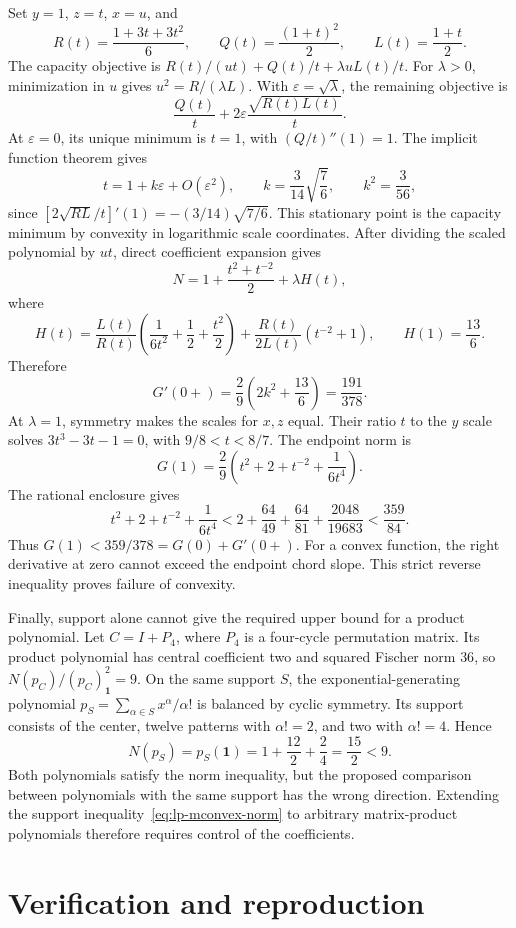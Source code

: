 \documentclass[11pt,a4paper]{article}
\theoremstyle{definition}
\theoremstyle{remark}
\begin{document}
Set $y=1$, $z=t$, $x=u$, and
\[
 R(t)=\frac{1+3t+3t^2}{6},\qquad
 Q(t)=\frac{(1+t)^2}{2},\qquad L(t)=\frac{1+t}{2}.
\]
The capacity objective is
$R(t)/(ut)+Q(t)/t+\lambda uL(t)/t$.
For $\lambda>0$, minimization in $u$ gives $u^2=R/(\lambda L)$.
With $\varepsilon=\sqrt\lambda$, the remaining objective is
\[
 \frac{Q(t)}t+2\varepsilon\frac{\sqrt{R(t)L(t)}}t.
\]
At $\varepsilon=0$, its unique minimum is $t=1$,
with $(Q/t)''(1)=1$.
The implicit function theorem gives
\[
 t=1+k\varepsilon+O(\varepsilon^2),\qquad
 k=\frac3{14}\sqrt{\frac76},\qquad k^2=\frac3{56},
\]
since $[2\sqrt{RL}/t]'(1)=-(3/14)\sqrt{7/6}$.
This stationary point is the capacity minimum by convexity in logarithmic
scale coordinates.
After dividing the scaled polynomial by $ut$, direct coefficient expansion
gives
\[
 N=1+\frac{t^2+t^{-2}}2+\lambda H(t),
\]
where
\[
 H(t)=\frac{L(t)}{R(t)}\left(\frac1{6t^2}+\frac12+\frac{t^2}2\right)
 +\frac{R(t)}{2L(t)}(t^{-2}+1),\qquad H(1)=\frac{13}6.
\]
Therefore
\[
 G'(0+)=\frac29\left(2k^2+\frac{13}6\right)=\frac{191}{378}.
\]
At $\lambda=1$, symmetry makes the scales for $x,z$ equal.
Their ratio $t$ to the $y$ scale solves
$3t^3-3t-1=0$, with $9/8<t<8/7$.
The endpoint norm is
\[
 G(1)=\frac29\left(t^2+2+t^{-2}+\frac1{6t^4}\right).
\]
The rational enclosure gives
\[
 t^2+2+t^{-2}+\frac1{6t^4}
 <2+\frac{64}{49}+\frac{64}{81}+\frac{2048}{19683}
 <\frac{359}{84}.
\]
Thus $G(1)<359/378=G(0)+G'(0+)$.
For a convex function, the right derivative at zero cannot exceed the
endpoint chord slope. This strict reverse inequality proves failure of
convexity.

Finally, support alone cannot give the required upper bound for a product
polynomial. Let $C=I+P_4$, where $P_4$ is a four-cycle permutation matrix.
Its product polynomial has central coefficient two and squared Fischer norm $36$, so
$N(p_C)/(p_C)_{\mathbf1}^2=9$.
On the same support $S$, the exponential-generating polynomial
$p_S=\sum_{\alpha\in S}x^\alpha/\alpha!$ is balanced by cyclic symmetry.
Its support consists of the center, twelve patterns with $\alpha!=2$, and
two with $\alpha!=4$. Hence
\[
 N(p_S)=p_S(\mathbf1)=1+\frac{12}2+\frac24=\frac{15}2<9.
\]
Both polynomials satisfy the norm inequality, but the proposed comparison between polynomials with the same support has the wrong direction.
Extending the support inequality~\eqref{eq:lp-mconvex-norm} to arbitrary matrix-product polynomials therefore requires control of the coefficients.


\section{Verification and reproduction}\label{sec:checks}
\end{document}
